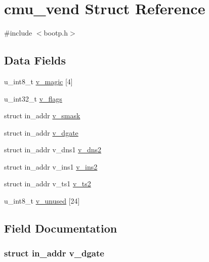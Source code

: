 \hypertarget{structcmu__vend}{}\section{cmu\+\_\+vend Struct Reference}
\label{structcmu__vend}


{\ttfamily \#include $<$bootp.\+h$>$}

\subsection*{Data Fields}
\begin{DoxyCompactItemize}
\item 
u\+\_\+int8\+\_\+t \hyperlink{structcmu__vend_aa6cf16e3bbed57f71d5e5e8c0471a90c}{v\+\_\+magic} \mbox{[}4\mbox{]}
\item 
u\+\_\+int32\+\_\+t \hyperlink{structcmu__vend_a125ce0e46db21df2cbebd4f0617bbf0a}{v\+\_\+flags}
\item 
struct in\+\_\+addr \hyperlink{structcmu__vend_a1e9ff24e75394cf7835dd71f40591cbf}{v\+\_\+smask}
\item 
struct in\+\_\+addr \hyperlink{structcmu__vend_a85730e0a72fd9ba4cfb8763b83a7d813}{v\+\_\+dgate}
\item 
struct in\+\_\+addr v\+\_\+dns1 \hyperlink{structcmu__vend_a3c46c0cfbeaef4732b3a5554746194f8}{v\+\_\+dns2}
\item 
struct in\+\_\+addr v\+\_\+ins1 \hyperlink{structcmu__vend_ae1618e0249e4c09f8beb905c21a83b83}{v\+\_\+ins2}
\item 
struct in\+\_\+addr v\+\_\+ts1 \hyperlink{structcmu__vend_a15156a832524a1ba3d60b1fcad77677e}{v\+\_\+ts2}
\item 
u\+\_\+int8\+\_\+t \hyperlink{structcmu__vend_aebf325713cf0b54c5f174d636edd2757}{v\+\_\+unused} \mbox{[}24\mbox{]}
\end{DoxyCompactItemize}


\subsection{Field Documentation}
\subsubsection[{\texorpdfstring{v\+\_\+dgate}{v_dgate}}]{\setlength{\rightskip}{0pt plus 5cm}struct in\+\_\+addr v\+\_\+dgate}\hypertarget{structcmu__vend_a85730e0a72fd9ba4cfb8763b83a7d813}{}\label{structcmu__vend_a85730e0a72fd9ba4cfb8763b83a7d813}
